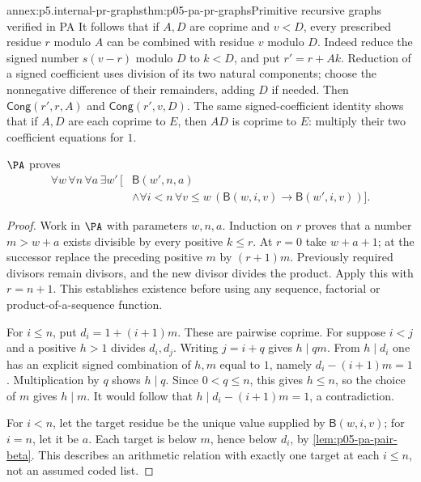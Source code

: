 \begin{annexitem}{annex:p5.internal-pr-graphs}{thm:p05-pa-pr-graphs}{Primitive recursive graphs verified in PA}
It follows that if \(A,D\) are coprime and \(v<D\), every prescribed
residue \(r\) modulo \(A\) can be combined with residue \(v\) modulo
\(D\).  Indeed reduce the signed number \(s(v-r)\) modulo \(D\) to
\(k<D\), and put \(r'=r+Ak\).  Reduction of a signed coefficient uses
division of its two natural components; choose the nonnegative difference
of their remainders, adding \(D\) if needed.  Then
\(\mathsf{Cong}(r',r,A)\) and \(\mathsf{Cong}(r',v,D)\).
The same signed-coefficient identity shows that if \(A,D\) are each
coprime to \(E\), then \(AD\) is coprime to \(E\): multiply
their two coefficient equations for \(1\).

\begin{annexlemma}
\label{thm:p05-pa-beta-extension}
\(\PA\) proves
\[
\begin{split}
 \forall w\,\forall n\,\forall a\,\exists w'\,\bigl[
 &\mathsf B(w',n,a)\\
 &\land\forall i<n\,\forall v\leq w\,
          (\mathsf B(w,i,v)\to\mathsf B(w',i,v))\bigr].
\end{split}
\]
\end{annexlemma}
\begin{proof}
Work in \(\PA\) with parameters \(w,n,a\).  Induction on \(r\)
proves that a number \(m>w+a\) exists divisible by every positive
\(k\leq r\).  At \(r=0\) take \(w+a+1\); at the successor replace
the preceding positive \(m\) by \((r+1)m\).  Previously required
divisors remain divisors, and the new divisor divides the product.  Apply
this with \(r=n+1\).  This establishes existence before using any
sequence, factorial or product-of-a-sequence function.

For \(i\leq n\), put \(d_i=1+(i+1)m\).  These are pairwise coprime.
For suppose \(i<j\) and a positive \(h>1\) divides \(d_i,d_j\).
Writing \(j=i+q\) gives \(h\mid qm\).  From \(h\mid d_i\)
one has an explicit signed combination of \(h,m\) equal to \(1\),
namely \(d_i-(i+1)m=1\).  Multiplication by \(q\) shows
\(h\mid q\).  Since \(0<q\leq n\), this gives \(h\leq n\),
so the choice of \(m\) gives \(h\mid m\).  It would follow that
\(h\mid d_i-(i+1)m=1\), a contradiction.

For \(i<n\), let the target residue be the unique value supplied by
\(\mathsf B(w,i,v)\); for \(i=n\), let it be \(a\).
Each target is below \(m\), hence below \(d_i\), by
\cref{lem:p05-pa-pair-beta}.  This describes an arithmetic relation with
exactly one target at each \(i\leq n\), not an assumed coded list.


\end{proof}
\end{annexitem}
